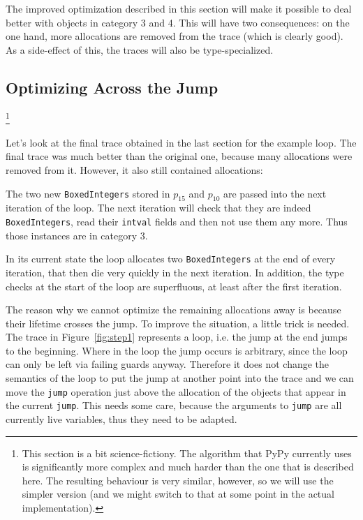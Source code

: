 \documentclass{sigplanconf}
\begin{document}
The improved optimization described in this section will make it possible to deal
better with objects in category 3 and 4. This will have two consequences: on
the one hand, more allocations are removed from the trace (which is clearly
good). As a side-effect of this, the traces will also be type-specialized.



\subsection{Optimizing Across the Jump}

\footnote{This section is a bit
science-fictiony. The algorithm that PyPy currently uses is significantly more
complex and much harder than the one that is described here. The resulting
behaviour is very similar, however, so we will use the simpler version (and we
might switch to that at some point in the actual implementation).}

Let's look at the final trace obtained in the last section for the example loop.
The final trace was much better than the original one, because many allocations
were removed from it. However, it also still contained allocations:

The two new \texttt{BoxedIntegers} stored in $p_{15}$ and $p_{10}$ are passed into
the next iteration of the loop. The next iteration will check that they are
indeed \texttt{BoxedIntegers}, read their \texttt{intval} fields and then not use them
any more. Thus those instances are in category 3.

In its current state the loop
allocates two \texttt{BoxedIntegers} at the end of every iteration, that then die
very quickly in the next iteration. In addition, the type checks at the start
of the loop are superfluous, at least after the first iteration.

The reason why we cannot optimize the remaining allocations away is because
their lifetime crosses the jump. To improve the situation, a little trick is
needed. The trace in Figure~\ref{fig:step1} represents a loop, i.e. the jump at the end jumps to
the beginning. Where in the loop the jump occurs is arbitrary, since the loop
can only be left via failing guards anyway. Therefore it does not change the
semantics of the loop to put the jump at another point into the trace and we
can move the \texttt{jump} operation just above the allocation of the objects that
appear in the current \texttt{jump}. This needs some care, because the arguments to
\texttt{jump} are all currently live variables, thus they need to be adapted.
\end{document}
